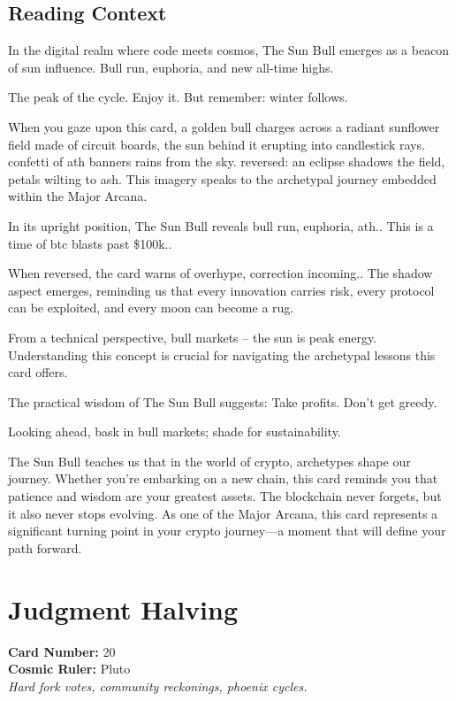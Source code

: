 \documentclass[11pt,oneside]{book}
\begin{document}
\begin{minipage}[t]{0.55\textwidth}
  \subsection*{Reading Context}
  In the digital realm where code meets cosmos, The Sun Bull emerges as a beacon of sun influence. Bull run, euphoria, and new all-time highs.

  The peak of the cycle. Enjoy it. But remember: winter follows.

  When you gaze upon this card, a golden bull charges across a radiant sunflower field made of circuit boards, the sun behind it erupting into candlestick rays. confetti of ath banners rains from the sky. reversed: an eclipse shadows the field, petals wilting to ash. This imagery speaks to the archetypal journey embedded within the Major Arcana.

  In its upright position, The Sun Bull reveals bull run, euphoria, ath.. This is a time of btc blasts past \$100k..

  When reversed, the card warns of overhype, correction incoming.. The shadow aspect emerges, reminding us that every innovation carries risk, every protocol can be exploited, and every moon can become a rug.

  From a technical perspective, bull markets – the sun is peak energy. Understanding this concept is crucial for navigating the archetypal lessons this card offers.

  The practical wisdom of The Sun Bull suggests: Take profits. Don't get greedy.

  Looking ahead, bask in bull markets; shade for sustainability.

  The Sun Bull teaches us that in the world of crypto, archetypes shape our journey. Whether you're embarking on a new chain, this card reminds you that patience and wisdom are your greatest assets. The blockchain never forgets, but it also never stops evolving. As one of the Major Arcana, this card represents a significant turning point in your crypto journey—a moment that will define your path forward.

\end{minipage}

\newpage
\section*{Judgment Halving}

\begin{minipage}[t]{0.55\textwidth}
  \vspace{0pt}
  \textbf{Card Number:} 20\\  \textbf{Cosmic Ruler:} Pluto\\  \textit{Hard fork votes, community reckonings, phoenix cycles.}
\end{minipage}
\end{document}
